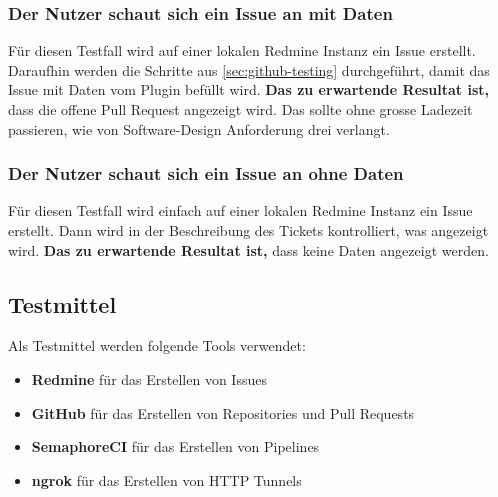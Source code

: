 \subsubsection{Der Nutzer schaut sich ein Issue an mit Daten}
Für diesen Testfall wird auf einer lokalen Redmine Instanz ein Issue erstellt. Daraufhin werden die Schritte aus
\ref{sec:github-testing} durchgeführt, damit das Issue mit Daten vom Plugin befüllt wird. \newline
\textbf{Das zu erwartende Resultat ist,} dass die offene Pull Request angezeigt wird. Das sollte ohne grosse Ladezeit passieren, wie von 
Software-Design Anforderung drei verlangt.

\subsubsection{Der Nutzer schaut sich ein Issue an ohne Daten}
Für diesen Testfall wird einfach auf einer lokalen Redmine Instanz ein Issue erstellt. Dann wird in der Beschreibung des Tickets
kontrolliert, was angezeigt wird. \newline
\textbf{Das zu erwartende Resultat ist,} dass keine Daten angezeigt werden.

\subsection{Testmittel}
Als Testmittel werden folgende Tools verwendet:
\begin{itemize}
  \item \textbf{Redmine} für das Erstellen von Issues
  \item \textbf{GitHub} für das Erstellen von Repositories und Pull Requests
  \item \textbf{SemaphoreCI} für das Erstellen von Pipelines
  \item \textbf{ngrok} für das Erstellen von HTTP Tunnels
\end{itemize}
